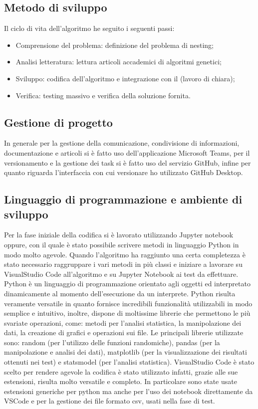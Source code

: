 \subsection{Metodo di sviluppo}
Il ciclo di vita dell'algoritmo he seguito i seguenti passi:
\begin{itemize}
    \item Comprensione del problema: definizione del problema di nesting;
    \item Analisi letteratura: lettura articoli accademici di algoritmi genetici;
    \item Sviluppo: codifica dell'algoritmo e integrazione con il (lavoro di chiara);
    \item Verifica: testing massivo e verifica della soluzione fornita.
\end{itemize}

\subsection{Gestione di progetto}

In generale per la gestione della comunicazione, condivisione di informazioni, documentazione e articoli si è fatto uso dell’applicazione Microsoft Teams, per il versionamento e la gestione dei task si è fatto uso del servizio GitHub, infine per quanto riguarda l’interfaccia con cui versionare ho utilizzato GitHub Desktop.

\subsection{Linguaggio di programmazione e ambiente di sviluppo}

Per la fase iniziale della codifica si è lavorato utilizzando Jupyter notebook oppure, con il quale è stato possibile scrivere metodi in linguaggio Python in modo molto agevole. Quando l'algoritmo ha raggiunto una certa completezza è stato necessario raggruppare i vari metodi in più classi e iniziare a lavorare su VisualStudio Code all'algoritmo e su Jupyter Notebook ai test da effettuare.
Python è un linguaggio di programmazione orientato agli oggetti ed interpretato dinamicamente al momento dell’esecuzione da un interprete. Python risulta veramente versatile in quanto fornisce incredibili funzionalità utilizzabili in modo semplice e intuitivo, inoltre, dispone di moltissime librerie che permettono le più svariate operazioni, come: metodi per l'analisi statistica, la manipolazione dei dati, la creazione di grafici e operazioni sui file. 
Le principali librerie utilizzate sono: random (per l'utilizzo delle funzioni randomiche), pandas (per la manipolazione e analisi dei dati), matplotlib (per la visualizzazione dei risultati ottenuti nei test) e statsmodel (per l'analisi statistica).
VisualStudio Code è stato scelto per rendere agevole la codifica è stato utilizzato infatti, grazie alle sue estensioni, risulta molto versatile e completo. In particolare sono state usate estensioni generiche per python ma anche per l'uso dei notebook direttamente da VSCode e per la gestione dei file formato csv, usati nella fase di test.

